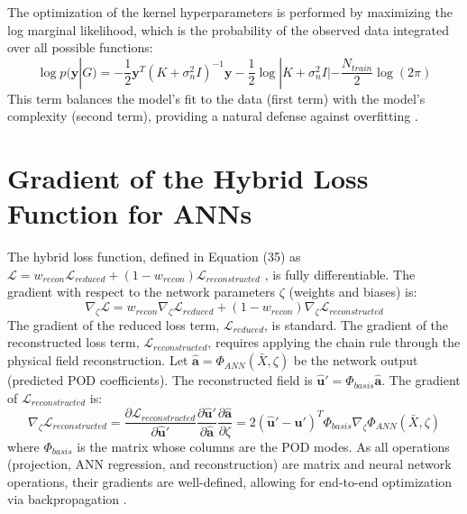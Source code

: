 \documentclass[dscexam, EN]{ufabcFHZh}
\begin{document}
The optimization of the kernel hyperparameters is performed by maximizing the log marginal likelihood, which is the probability of the observed data integrated over all possible functions:
\begin{equation}
    \log p(\mathbf{y} | G) = -\frac{1}{2} \mathbf{y}^T (K + \sigma_n^2 I)^{-1} \mathbf{y} - \frac{1}{2} \log |K + \sigma_n^2 I| - \frac{N_{train}}{2} \log(2\pi)
\end{equation}
This term balances the model's fit to the data (first term) with the model's complexity (second term), providing a natural defense against overfitting \cite{[1]}.

\section{Gradient of the Hybrid Loss Function for ANNs}
\label{sec:loss_derivation}

The hybrid loss function, defined in Equation (35) as $\mathcal{L} = w_{recon}\mathcal{L}_{reduced} + (1 - w_{recon})\mathcal{L}_{reconstructed}$ \cite{[1]}, is fully differentiable. The gradient with respect to the network parameters $\zeta$ (weights and biases) is:
\begin{equation}
    \nabla_\zeta \mathcal{L} = w_{recon} \nabla_\zeta \mathcal{L}_{reduced} + (1 - w_{recon}) \nabla_\zeta \mathcal{L}_{reconstructed}
\end{equation}
The gradient of the reduced loss term, $\mathcal{L}_{reduced}$, is standard. The gradient of the reconstructed loss term, $\mathcal{L}_{reconstructed}$, requires applying the chain rule through the physical field reconstruction. Let $\hat{\mathbf{a}} = \Phi_{ANN}(\bar{X}, \zeta)$ be the network output (predicted POD coefficients). The reconstructed field is $\hat{\mathbf{u}}' = \Phi_{basis} \hat{\mathbf{a}}$. The gradient of $\mathcal{L}_{reconstructed}$ is:
\begin{equation}
    \nabla_\zeta \mathcal{L}_{reconstructed} = \frac{\partial \mathcal{L}_{reconstructed}}{\partial \hat{\mathbf{u}}'} \frac{\partial \hat{\mathbf{u}}'}{\partial \hat{\mathbf{a}}} \frac{\partial \hat{\mathbf{a}}}{\partial \zeta} = 2(\hat{\mathbf{u}}' - \mathbf{u}')^T \Phi_{basis} \nabla_\zeta \Phi_{ANN}(\bar{X}, \zeta)
\end{equation}
where $\Phi_{basis}$ is the matrix whose columns are the POD modes. As all operations (projection, ANN regression, and reconstruction) are matrix and neural network operations, their gradients are well-defined, allowing for end-to-end optimization via backpropagation \cite{[1]}.
\end{document}
